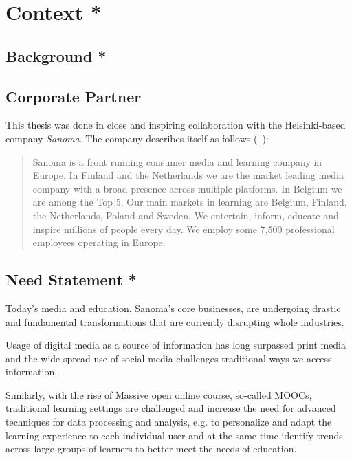 
\clearpage
\section{Context *}

\subsection{Background *}



\subsection{Corporate Partner}

This thesis was done in close and inspiring collaboration with the Helsinki-based company \emph{Sanoma}. The company describes itself as follows (~\cite{sanoma-about}):

\blockquote{Sanoma is a front running consumer media and learning company in Europe. In Finland and the Netherlands we are the market leading media company with a broad presence across multiple platforms. In Belgium we are among the Top 5. Our main markets in learning are Belgium, Finland, the Netherlands, Poland and Sweden. We entertain, inform, educate and inspire millions of people every day. We employ some 7,500 professional employees operating in Europe.}

\subsection{Need Statement *}

Today's media and education, Sanoma's core businesses, are undergoing drastic and fundamental transformations that are currently disrupting whole industries. 

Usage of digital media as a source of information has long surpassed print media  and the wide-spread use of social media challenges traditional ways we access information. 

Similarly, with the rise of Massive open online course, so-called MOOCs, traditional learning settings are challenged and increase the need for advanced techniques for data processing and analysis, e.g. to personalize and adapt the learning experience to each individual user and at the same time identify trends across large groups of learners to better meet the needs of education.

